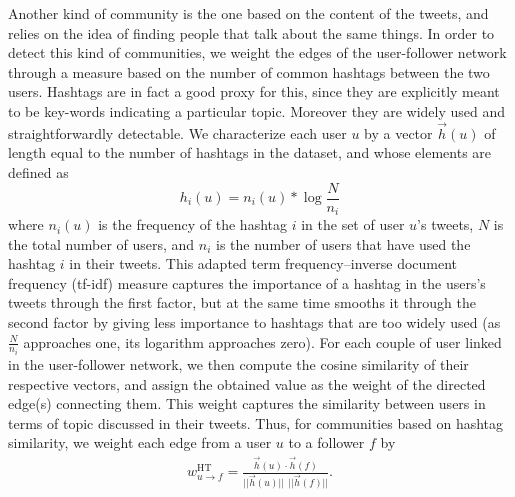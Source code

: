 Another kind of community is the one based on the content of the tweets, and relies on the idea of finding people that talk about the same things. In order to detect this kind of communities, we weight the edges of the user-follower network through a measure based on the number of common hashtags between the two users. Hashtags are in fact a good proxy for this, since they are explicitly meant to be key-words indicating a particular topic. Moreover they are widely used and straightforwardly detectable. We characterize each user $u$ by a vector $\vec{h}(u)$ of length equal to the number of hashtags in the dataset, and whose elements are defined as
\begin{equation}
h_i(u) = n_i(u) * \log{ \frac{N}{n_i} }
\end{equation}
where $n_i(u)$ is the frequency of the hashtag $i$ in the set of user $u$'s tweets, $N$ is the total number of users, and $n_i$ is the number of users that have used the hashtag $i$ in their tweets. This adapted term frequency--inverse document frequency (tf-idf) measure \cite{salton_introduction_1983} captures the importance of a hashtag in the users's tweets through the first factor, but at the same time smooths it through the second factor by giving less importance to hashtags that are too widely used (as $\frac{N}{n_i}$ approaches one, its logarithm approaches zero). For each couple of user linked in the user-follower network, we then compute the cosine similarity of their respective vectors, and assign the obtained value as the weight of the directed edge(s) connecting them. This weight captures the similarity between users in terms of topic discussed in their tweets. Thus, for communities based on hashtag similarity, we weight each edge from a user $u$ to a follower $f$ by 
\begin{align}
	w_{u \to f}^{\text{HT}} = \frac{\vec{h}(u) \cdot \vec{h}(f)}{||\vec{h}(u)|| \ \ ||\vec{h}(f)||}.
\end{align}